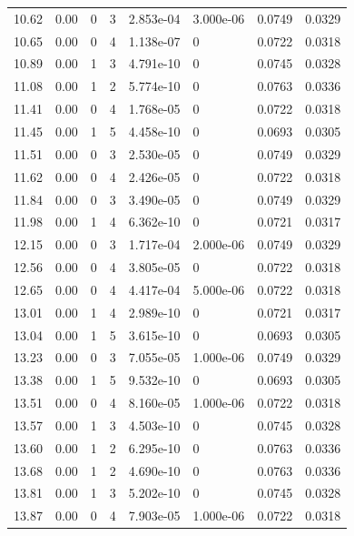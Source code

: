 \documentclass[preview]{standalone}
\begin{document}
{{{\begin{tabular}{L{1.2cm}C{1.2cm} C{0.3cm}C{0.5cm} C{1.4cm}C{1.4cm} C{1.4cm}C{1.4cm}}
  10.62  &  0.00  & 0     &  3 &  2.853e-04  & 3.000e-06  & 0.0749 &  0.0329   \\ 
  10.65  &  0.00  & 0     &  4 &  1.138e-07  & 0  & 0.0722 &  0.0318   \\ 
  10.89  &  0.00  & 1     &  3 &  4.791e-10  & 0  & 0.0745 &  0.0328   \\ 
  11.08  &  0.00  & 1     &  2 &  5.774e-10  & 0  & 0.0763 &  0.0336   \\ 
  11.41  &  0.00  & 0     &  4 &  1.768e-05  & 0  & 0.0722 &  0.0318   \\ 
  11.45  &  0.00  & 1     &  5 &  4.458e-10  & 0  & 0.0693 &  0.0305   \\ 
  11.51  &  0.00  & 0     &  3 &  2.530e-05  & 0  & 0.0749 &  0.0329   \\ 
  11.62  &  0.00  & 0     &  4 &  2.426e-05  & 0  & 0.0722 &  0.0318   \\ 
  11.84  &  0.00  & 0     &  3 &  3.490e-05  & 0  & 0.0749 &  0.0329   \\ 
  11.98  &  0.00  & 1     &  4 &  6.362e-10  & 0  & 0.0721 &  0.0317   \\ 
  12.15  &  0.00  & 0     &  3 &  1.717e-04  & 2.000e-06  & 0.0749 &  0.0329   \\ 
  12.56  &  0.00  & 0     &  4 &  3.805e-05  & 0  & 0.0722 &  0.0318   \\ 
  12.65  &  0.00  & 0     &  4 &  4.417e-04  & 5.000e-06  & 0.0722 &  0.0318   \\ 
  13.01  &  0.00  & 1     &  4 &  2.989e-10  & 0  & 0.0721 &  0.0317   \\ 
  13.04  &  0.00  & 1     &  5 &  3.615e-10  & 0  & 0.0693 &  0.0305   \\ 
  13.23  &  0.00  & 0     &  3 &  7.055e-05  & 1.000e-06  & 0.0749 &  0.0329   \\ 
  13.38  &  0.00  & 1     &  5 &  9.532e-10  & 0  & 0.0693 &  0.0305   \\ 
  13.51  &  0.00  & 0     &  4 &  8.160e-05  & 1.000e-06  & 0.0722 &  0.0318   \\ 
  13.57  &  0.00  & 1     &  3 &  4.503e-10  & 0  & 0.0745 &  0.0328   \\ 
  13.60  &  0.00  & 1     &  2 &  6.295e-10  & 0  & 0.0763 &  0.0336   \\ 
  13.68  &  0.00  & 1     &  2 &  4.690e-10  & 0  & 0.0763 &  0.0336   \\ 
  13.81  &  0.00  & 1     &  3 &  5.202e-10  & 0  & 0.0745 &  0.0328   \\ 
  13.87  &  0.00  & 0     &  4 &  7.903e-05  & 1.000e-06  & 0.0722 &  0.0318   \\ 

\end{tabular}}}}
\end{document}
